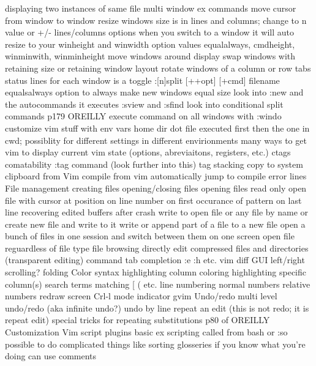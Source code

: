 \documentclass[12pt]{book}
\begin{document}
{      displaying two instances of same file
      multi window ex commands
      move cursor from window to window
      resize windows
        size is in lines and columns; change to n value or +/- lines/columns
        options 
          when you switch to a window it will auto resize to your winheight and winwidth option values
          equalalways, cmdheight, winminwith, winminheight
      move windows around display
        swap windows with retaining size or retaining window layout
        rotate windows of a column or row
      tabs
      status lines for each window is a toggle
      :[n]split [++opt] [+cmd] filename
      equalsalways option to always make new windows equal size
      look into :new and the autocommands it executes
      :sview and :sfind
      look into conditional split commands p179 OREILLY
      execute command on all windows with :windo 
    customize vim stuff with env vars 
  home dir dot file executed first then the one in cwd; possiblity for different settings in different envirionments
  many ways to get vim to display current vim state (options, abreviaitons, registers, etc.)
  ctags comatability
    :tag command (look further into this)
    tag stacking
  copy to system clipboard from Vim
  compile from vim
  automatically jump to compile error lines
  File management
    creating files
    opening/closing files
    opening files read only
    open file with cursor at position
      on line number
      on first occurance of pattern
      on last line
    recovering edited buffers after crash
    write to open file or any file by name or create new file and write to it
    write or append part of a file to a new file
    open a bunch of files in one session and switch between them on one screen
    open file reguardless of file type
    file browsing
    directly edit compressed files and directories (transparent editing)
  command tab completion :e :h etc.
  vim diff
GUI
  left/right scrolling?
  folding
  Color
    syntax highlighting
    column coloring
  highlighting
    specific column(s)
    search terms
    matching { [ ( etc.
  line numbering
    normal numbers
    relative numbers
  redraw screen Crl-l
  mode indicator
  gvim 
Undo/redo
  multi level undo/redo (aka infinite undo?)
  undo by line
  repeat an edit (this is not redo; it is repeat edit)
  special tricks for repeating substitutions p80 of OREILLY
Customization
  Vim script
    plugins
    basic ex scripting called from bash or :so
      possible to do complicated things like sorting glosseries if you know what you're doing
      can use comments 
}}
\end{document}

